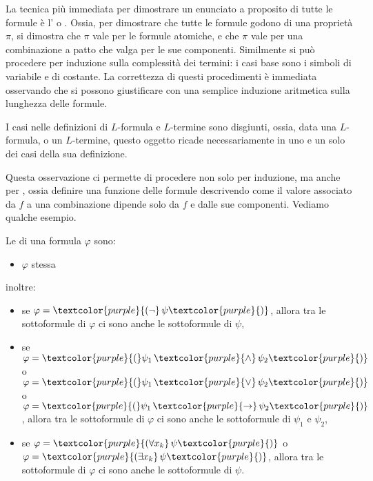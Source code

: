 La tecnica più immediata per dimostrare un enunciato a proposito di tutte le formule è l' o . Ossia, per dimostrare che tutte le formule godono di una proprietà $\pi$,
si dimostra che $\pi$ vale per le formule atomiche, e che $\pi$ vale per una combinazione a patto che valga per le sue componenti. Similmente si può procedere per induzione sulla complessità dei termini: i casi base sono i simboli di variabile e di costante.
La correttezza di questi procedimenti è immediata osservando che si possono giustificare con una semplice induzione aritmetica sulla lunghezza delle formule.

\begin{remark}
    I casi nelle definizioni di $L$-formula e $L$-termine sono disgiunti, ossia, data una $L$-formula, o un $L$-termine, questo oggetto ricade necessariamente in uno e un solo dei casi della sua definizione.
\end{remark}

Questa osservazione ci permette di procedere non solo per induzione, ma anche per , ossia definire una funzione delle formule descrivendo come il valore associato da $f$ a una combinazione
dipende solo da $f$ e dalle sue componenti. Vediamo qualche esempio.

\begin{definition}
    [Sottoformula]
    Le  di una formula $\varphi$ sono:
    \begin{itemize}
        \item $\varphi$ stessa
    \end{itemize}
    inoltre:
    \begin{itemize}
        \item se $\varphi = \textcolor{purple}{(\neg}\, \psi \textcolor{purple}{)}$, allora tra le sottoformule di $\varphi$ ci sono anche le sottoformule di $\psi$,
        \item se $\varphi = \textcolor{purple}{(} \psi_1 \,\textcolor{purple}{\land} \,\psi_2 \textcolor{purple}{)}$ o $\varphi = \textcolor{purple}{(} \psi_1\, \textcolor{purple}{\lor}\, \psi_2 \textcolor{purple}{)}$ o
        $\varphi = \textcolor{purple}{(} \psi_1\, \textcolor{purple}{\to} \,\psi_2 \textcolor{purple}{)}$, allora tra le sottoformule di $\varphi$ ci sono anche le sottoformule di $\psi_1$ e $\psi_2$,
        \item se $\varphi = \textcolor{purple}{(\forall x_k} \,\psi \textcolor{purple}{)}$ o $\varphi = \textcolor{purple}{(\exists x_k}\, \psi \textcolor{purple}{)}$, allora tra le sottoformule di $\varphi$ ci sono anche le sottoformule di $\psi$.
    \end{itemize}
\end{definition}

